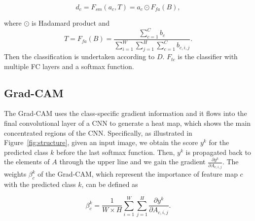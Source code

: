 \documentclass{article}
\begin{document}
\begin{equation}
    d_c=F_{sm}(a_{c},T)=a_{c} \odot F_{fa}(B),
\end{equation}

\noindent where $\odot$ is Hadamard product and
\begin{equation}
    T=F_{fa}(B)=\frac{\sum_{c=1}^C b_{c}}{\sum_{i=1}^W\sum_{j=1}^H \sum_{c=1}^C b_{c,i,j}}.
\end{equation}
Then the classification is undertaken according to $D$. $F_{tc}$ is the classifier with multiple FC layers and a softmax function.

\vspace{-2mm}
\subsection{Grad-CAM}

The Grad-CAM uses the class-specific gradient information and it flows into the final convolutional layer of a CNN to generate a heat map, which shows the main concentrated regions of the CNN. Specifically, as illustrated in Figure~\ref{fig:structure}, given an input image, we obtain the score $y^{k}$ for the predicted class $k$ before the last softmax function. Then, $y^{k}$ is propagated back to the elements of $A$ through the upper line and we gain the gradient $\frac{{\partial {y^k}}}{{\partial A_{c,i,j}}}$. The weights $\beta_c^k$ of the Grad-CAM, which represent the importance of feature map $c$ with the predicted class $k$, can be defined as

\begin{equation}
    \beta_c^k = \frac{1}{W\times H}\sum_{i=1}^W\sum_{j=1}^H\frac{{\partial {y^k}}}{{\partial A_{c,i,j}}}.
\end{equation}
\end{document}
